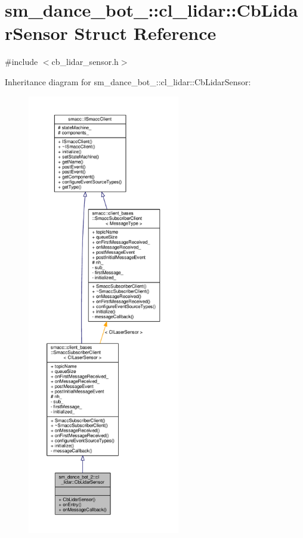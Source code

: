 \hypertarget{structsm__dance__bot__2_1_1cl__lidar_1_1CbLidarSensor}{}\section{sm\+\_\+dance\+\_\+bot\+\_\+:\+:cl\+\_\+lidar\+:\+:Cb\+Lidar\+Sensor Struct Reference}
\label{structsm__dance__bot__2_1_1cl__lidar_1_1CbLidarSensor}


{\ttfamily \#include $<$cb\+\_\+lidar\+\_\+sensor.\+h$>$}



Inheritance diagram for sm\+\_\+dance\+\_\+bot\+\_\+:\+:cl\+\_\+lidar\+:\+:Cb\+Lidar\+Sensor\+:\nopagebreak
\begin{figure}[H]
\begin{center}
\leavevmode
\includegraphics[height=550pt]{structsm__dance__bot__2_1_1cl__lidar_1_1CbLidarSensor__inherit__graph}
\end{center}
\end{figure}


